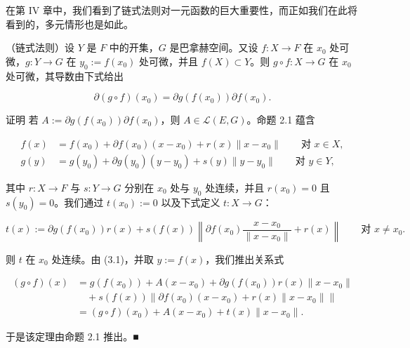 在第 IV 章中，我们看到了链式法则对一元函数的巨大重要性，而正如我们在此将看到的，多元情形也是如此。

\begin{theorem}

（链式法则）设 $ Y $ 是 $ F $ 中的开集，$ G $ 是巴拿赫空间。又设 $ f : X \to F $ 在 $ x_0 $ 处可微，$ g : Y \to G $ 在 $ y_0 := f(x_0) $ 处可微，并且 $ f(X) \subset Y $。则 $ g \circ f : X \to G $ 在 $ x_0 $ 处可微，其导数由下式给出

\[
\partial(g \circ f)(x_0) = \partial g(f(x_0))\partial f(x_0) .
\]

证明 若 $ A := \partial g(f(x_0))\partial f(x_0) $，则 $ A \in \mathcal{L}(E, G) $。命题 2.1 蕴含

\begin{equation}
\begin{aligned}
f(x) &= f(x_0) + \partial f(x_0)(x - x_0) + r(x)\|x - x_0\| \qquad \text{对 } x \in X , \\ g(y) &= g(y_0) + \partial g(y_0)(y - y_0) + s(y)\|y - y_0\| \qquad \text{对 } y \in Y ,
\end{aligned}\tag{3.1}
\end{equation}

其中 $ r : X \to F $ 与 $ s : Y \to G $ 分别在 $ x_0 $ 处与 $ y_0 $ 处连续，并且 $ r(x_0) = 0 $ 且 $ s(y_0) = 0 $。我们通过 $ t(x_0) := 0 $ 以及下式定义 $ t : X \to G $：

\[
t(x) := \partial g(f(x_0))r(x) + s(f(x))\left\|\partial f(x_0)\frac{x - x_0}{\|x - x_0\|} + r(x)\right\| \qquad \text{对 } x \ne x_0 .
\]

则 $ t $ 在 $ x_0 $ 处连续。由 (3.1)，并取 $ y := f(x) $，我们推出关系式

\begin{equation*}
\begin{aligned}
(g \circ f)(x) &= g(f(x_0)) + A(x - x_0) + \partial g(f(x_0))r(x)\|x - x_0\| \\ &\quad + s(f(x))\left\|\partial f(x_0)(x - x_0) + r(x)\|x - x_0\|\right\| \\ &= (g \circ f)(x_0) + A(x - x_0) + t(x)\|x - x_0\| .
\end{aligned}
\end{equation*}

于是该定理由命题 2.1 推出。\nobreak\hspace{0.35em}■

\end{theorem}

